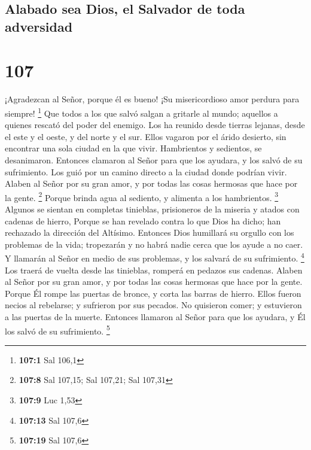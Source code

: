 \hypertarget{alabado-sea-dios-el-salvador-de-toda-adversidad}{%
\subsection{Alabado sea Dios, el Salvador de toda
adversidad}\label{alabado-sea-dios-el-salvador-de-toda-adversidad}}

\hypertarget{section-106}{%
\section{107}\label{section-106}}

 ¡Agradezcan al Señor, porque él es bueno! ¡Su
misericordioso amor perdura para siempre! \footnote{\textbf{107:1} Sal
  106,1}  Que todos a los que salvó salgan a gritarle al
mundo; aquellos a quienes rescató del poder del enemigo. 
Los ha reunido desde tierras lejanas, desde el este y el oeste, y del
norte y el sur.  Ellos vagaron por el árido desierto, sin
encontrar una sola ciudad en la que vivir.  Hambrientos y
sedientos, se desanimaron.  Entonces clamaron al Señor para
que los ayudara, y los salvó de su sufrimiento.  Los guió
por un camino directo a la ciudad donde podrían vivir. 
Alaben al Señor por su gran amor, y por todas las cosas hermosas que
hace por la gente. \footnote{\textbf{107:8} Sal 107,15; Sal 107,21; Sal
  107,31}  Porque brinda agua al sediento, y alimenta a los
hambrientos. \footnote{\textbf{107:9} Luc 1,53}  Algunos se
sientan en completas tinieblas, prisioneros de la miseria y atados con
cadenas de hierro,  Porque se han revelado contra lo que
Dios ha dicho; han rechazado la dirección del Altísimo. 
Entonces Dios humillará su orgullo con los problemas de la vida;
tropezarán y no habrá nadie cerca que los ayude a no caer. 
Y llamarán al Señor en medio de sus problemas, y los salvará de su
sufrimiento. \footnote{\textbf{107:13} Sal 107,6}  Los
traerá de vuelta desde las tinieblas, romperá en pedazos sus cadenas.
 Alaben al Señor por su gran amor, y por todas las cosas
hermosas que hace por la gente.  Porque Él rompe las
puertas de bronce, y corta las barras de hierro.  Ellos
fueron necios al rebelarse; y sufrieron por sus pecados. 
No quisieron comer; y estuvieron a las puertas de la muerte.
 Entonces llamaron al Señor para que los ayudara, y Él los
salvó de su sufrimiento. \footnote{\textbf{107:19} Sal 107,6}
